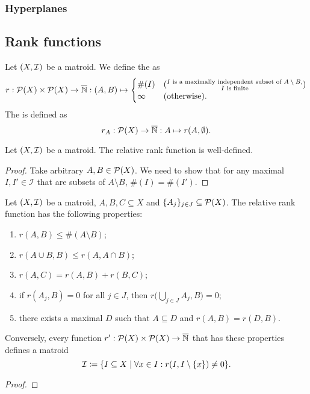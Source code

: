 \subsubsection{Hyperplanes}


\subsection{Rank functions}
\begin{definition}
Let $\left( X,\mathcal{I} \right)$ be a matroid. We define the  as
\[ r: \operatorname{\mathcal{P}}(X)\times \operatorname{\mathcal{P}}(X) \to \overline{\mathbb{N}}: (A, B) \mapsto \begin{cases}
\#(I) & (\substack{\text{$I$ is a maximally independent subset of $A\setminus B$}, \\ \text{$I$ is finite}}) \\
\infty & (\text{otherwise}).
\end{cases} \]
The  is defined as
\[ r_A: \operatorname{\mathcal{P}}(X) \to \overline{\mathbb{N}}: A \mapsto r(A, \emptyset). \]
\end{definition}

\begin{lemma}
Let $\left( X,\mathcal{I} \right)$ be a matroid. The relative rank function is well-defined.
\end{lemma}
\begin{proof}
Take arbitrary $A,B\in \operatorname{\mathcal{P}}(X)$. We need to show that for any maximal $I,I'\in \mathcal{I}$ that are subsets of $A\setminus B$, $\#(I) = \#(I')$.
\end{proof}

\begin{proposition}
Let $\left( X,\mathcal{I} \right)$ be a matroid, $A,B,C\subseteq X$ and $\{A_j\}_{j\in J}\subseteq \operatorname{\mathcal{P}}(X)$. The relative rank function has the following properties:
\begin{enumerate}
\item $r(A,B) \leq \#(A\setminus B)$;
\item $r(A\cup B, B) \leq r(A, A\cap B)$;
\item $r(A,C) = r(A,B)+ r(B,C)$;
\item if $r(A_j, B)=0$ for all $j\in J$, then $r\big(\bigcup_{j\in J}A_j, B) = 0$;
\item there exists a maximal $D$ such that $A\subseteq D$ and $r(A,B) = r(D, B)$.
\end{enumerate}
Conversely, every function $r': \operatorname{\mathcal{P}}(X)\times \operatorname{\mathcal{P}}(X) \to \overline{\mathbb{N}}$ that has these properties defines a matroid
\[ \mathcal{I} \defeq \setbuilder{I\subseteq X}{\forall x\in I: r(I, I\setminus\{x\})\neq 0}. \]
\end{proposition}
\begin{proof}

\end{proof}


